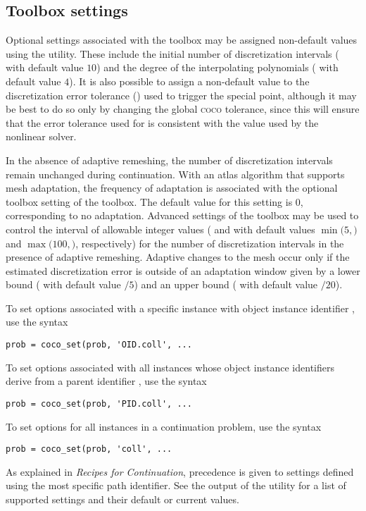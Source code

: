 \subsection{Toolbox settings}
Optional settings associated with the  toolbox may be assigned non-default values using the  utility. These include the initial number of discretization intervals ( with default value $10$) and the degree of the interpolating polynomials ( with default value $4$). It is also possible to assign a non-default value to the discretization error tolerance () used to trigger the  special point, although it may be best to do so only by changing the global \textsc{coco} tolerance, since this will ensure that the error tolerance used for  is consistent with the value used by the nonlinear solver.

In the absence of adaptive remeshing, the number of discretization intervals remain unchanged during continuation. With an atlas algorithm that supports mesh adaptation, the frequency of adaptation is associated with the optional toolbox setting  of the  toolbox. The default value for this setting is $0$, corresponding to no adaptation. Advanced settings of the  toolbox may be used to control the interval of allowable integer values ( and  with default values $\min(5,$$)$ and $\max(100,$$)$, respectively) for the number of discretization intervals in the presence of adaptive remeshing. Adaptive changes to the mesh occur only if the estimated discretization error is outside of an adaptation window given by a lower bound ( with default value $/5$) and an upper bound ( with default value $/20$).

To set options associated with a specific  instance with object instance identifier , use the syntax
\begin{lstlisting}[language=coco-highlight]
prob = coco_set(prob, 'OID.coll', ...
\end{lstlisting}
To set options associated with all  instances whose object instance identifiers derive from a parent identifier , use the syntax
\begin{lstlisting}[language=coco-highlight]
prob = coco_set(prob, 'PID.coll', ...
\end{lstlisting}
To set options for all  instances in a continuation problem, use the syntax 
\begin{lstlisting}[language=coco-highlight]
prob = coco_set(prob, 'coll', ...
\end{lstlisting}
As explained in \emph{Recipes for Continuation}, precedence is given to settings defined using the most specific path identifier. See the output of the  utility for a list of supported settings and their default or current values.

